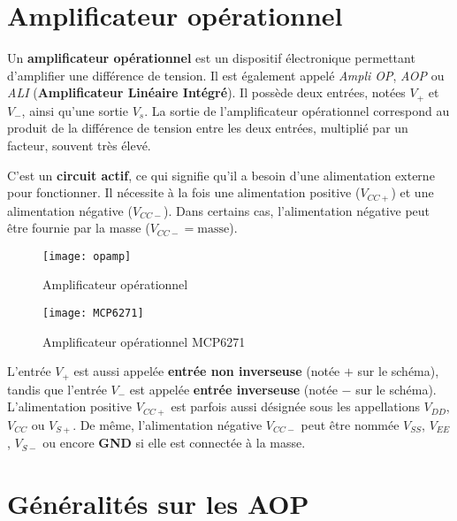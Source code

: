 \section{Amplificateur opérationnel}\label{electronique:opamp}

Un \textbf{amplificateur opérationnel} est un dispositif électronique permettant 
d'amplifier une différence de tension. Il est également appelé \textit{Ampli OP}, 
\textit{AOP} ou \textit{ALI} (\textbf{Amplificateur Linéaire Intégré}). Il 
possède deux entrées, notées \(V_+\) et \(V_-\), ainsi qu'une sortie 
\(V_s\). La sortie de l'amplificateur opérationnel correspond au produit de 
la différence de tension entre les deux entrées, multiplié par un facteur, 
souvent très élevé.

C'est un \textbf{circuit actif}, ce qui signifie qu'il a besoin d'une 
alimentation externe pour fonctionner. Il nécessite à la fois une alimentation 
positive (\(V_{CC+}\)) et une alimentation négative (\(V_{CC-}\)). Dans 
certains cas, l'alimentation négative peut être fournie par la masse 
(\(V_{CC-} = \text{masse}\)).


\begin{minipage}{0.49\textwidth}
    \begin{figure}[H]
        \centering
        \texttt{[image: opamp]}
        \caption{Amplificateur opérationnel}
        \label{fig:opamp}
    \end{figure}
\end{minipage}
\begin{minipage}{0.5\textwidth}
    \begin{figure}[H]
        \centering
        \texttt{[image: MCP6271]}
        \caption{Amplificateur opérationnel MCP6271}
        \label{fig:opamp-symbol}
    \end{figure}
\end{minipage}

L'entrée \(V_+\) est aussi appelée \textbf{entrée non inverseuse} (notée 
\(+\) sur le schéma), tandis que l'entrée \(V_-\) est appelée 
\textbf{entrée inverseuse} (notée \(-\) sur le schéma). L'alimentation 
positive \(V_{CC+}\) est parfois aussi désignée sous les appellations
\(V_{DD}\), \(V_{CC}\) ou \(V_{S+}\). De même, l'alimentation négative 
\(V_{CC-}\) peut être nommée \(V_{SS}\), \(V_{EE}\), \(V_{S-}\) ou 
encore \textbf{GND} si elle est connectée à la masse.

\section{Généralités sur les AOP}

